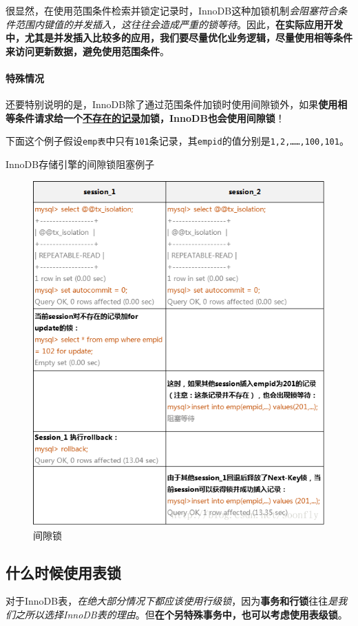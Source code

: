 \documentclass[UTF8,a4paper,12pt]{ctexbook}
\begin{document}
			很显然，在使用范围条件检索并锁定记录时，InnoDB这种加锁机制\textit{会阻塞符合条件范围内键值的并发插入，这往往会造成严重的锁等待}。因此，\textbf{在实际应用开发中，尤其是并发插入比较多的应用，我们要尽量优化业务逻辑，尽量使用相等条件来访问更新数据，避免使用范围条件}。
			
			
			\paragraph{特殊情况}
				还要特别说明的是，InnoDB除了通过范围条件加锁时使用间隙锁外，如果\textbf{使用相等条件请求给一个\underline{不存在的记录}加锁，InnoDB也会使用间隙锁}！
				
				下面这个例子假设\verb|emp表|中只有\verb|101|条记录，其\verb|empid|的值分别是\verb|1,2,……,100,101|。
				
				InnoDB存储引擎的间隙锁阻塞例子 
				\begin{figure}[H]
					\centering
					\includegraphics[width=13cm]{lock-next}
					\caption{间隙锁}
				\end{figure}			
				
				
		\subsection{什么时候使用表锁}
			对于InnoDB表，\textit{在绝大部分情况下都应该使用行级锁}，因为\textbf{事务和行锁}往往\textit{是我们之所以选择InnoDB表的理由}。但\textbf{在个另特殊事务中，也可以考虑使用表级锁}。
			
\end{document}
